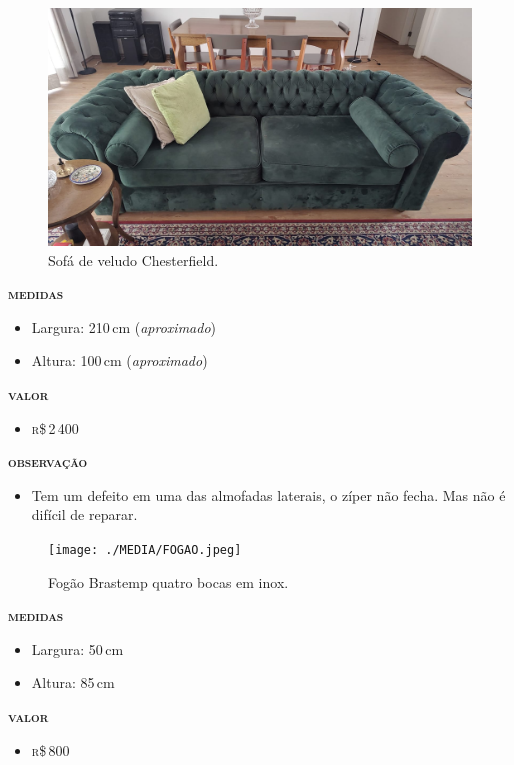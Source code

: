 \begin{figure}[htpb!]
\includegraphics[width=\textwidth]{./MEDIA/SOFA.jpeg}
\caption{Sofá de veludo Chesterfield.}
\end{figure}
\noindent\textsc{\textbf{medidas}}
\begin{itemize}
\item Largura: 210\,cm (\textit{aproximado})
\item Altura: 100\,cm (\textit{aproximado})
\end{itemize}
\noindent\textsc{\textbf{valor}}
\begin{itemize}
\item \textsc{r}\$\,2\,400
\end{itemize}
\noindent\textsc{\textbf{observação}}
\begin{itemize}
\item Tem um defeito em uma das almofadas laterais, o zíper não fecha. Mas não é difícil de reparar.
\end{itemize}

\pagebreak

\begin{figure}[htpb!]
\begin{center}
\texttt{[image: ./MEDIA/FOGAO.jpeg]}
\caption{Fogão Brastemp quatro bocas em inox.}
\end{center}
\end{figure}
\noindent\textsc{\textbf{medidas}}
\begin{itemize}
\item Largura: 50\,cm
\item Altura: 85\,cm
\end{itemize}
\noindent\textsc{\textbf{valor}}
\begin{itemize}
\item \textsc{r}\$\,800
\end{itemize}
 
